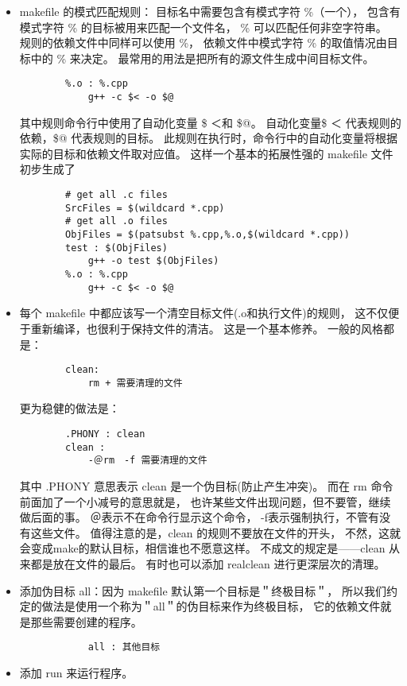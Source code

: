 \begin{itemize}
	\item makefile 的模式匹配规则：
		目标名中需要包含有模式字符 \%（一个），
		包含有模式字符 \% 的目标被用来匹配一个文件名， 
		\% 可以匹配任何非空字符串。
		规则的依赖文件中同样可以使用 \%，
		依赖文件中模式字符 \% 的取值情况由目标中的 \% 来决定。
		最常用的用法是把所有的源文件生成中间目标文件。
		\begin{verbatim}
		%.o : %.cpp
   			g++ -c $< -o $@ 
		\end{verbatim}
		其中规则命令行中使用了自动化变量 \$ ＜和 \$@。
		自动化变量\$ ＜ 代表规则的依赖，\$@ 代表规则的目标。
		此规则在执行时，命令行中的自动化变量将根据实际的目标和依赖文件取对应值。
		这样一个基本的拓展性强的 makefile 文件初步生成了
		\begin{verbatim}
		# get all .c files
		SrcFiles = $(wildcard *.cpp)
		# get all .o files
		ObjFiles = $(patsubst %.cpp,%.o,$(wildcard *.cpp))
		test : $(ObjFiles)
   			g++ -o test $(ObjFiles)
		%.o : %.cpp
   			g++ -c $< -o $@ 
		\end{verbatim}
	\item 每个 makefile 中都应该写一个清空目标文件(.o和执行文件)的规则，
		这不仅便于重新编译，也很利于保持文件的清洁。
		这是一个基本修养。
		一般的风格都是：
		\begin{verbatim}
		clean: 
   			rm + 需要清理的文件
		\end{verbatim}		
		更为稳健的做法是：
		\begin{verbatim}
		.PHONY : clean
		clean :
   			-＠rm　-f 需要清理的文件 
		\end{verbatim}	
		其中 .PHONY 意思表示 clean 是一个伪目标(防止产生冲突)。
		而在 rm 命令前面加了一个小减号的意思就是，
		也许某些文件出现问题，但不要管，继续做后面的事。
		＠表示不在命令行显示这个命令，
		-f表示强制执行，不管有没有这些文件。
		值得注意的是，clean 的规则不要放在文件的开头，
		不然，这就会变成make的默认目标，相信谁也不愿意这样。
		不成文的规定是——clean 从来都是放在文件的最后。
		有时也可以添加 realclean 进行更深层次的清理。
	\item 添加伪目标 all：因为 makefile 默认第一个目标是＂终极目标＂，
		所以我们约定的做法是使用一个称为＂all＂的伪目标来作为终极目标，
		它的依赖文件就是那些需要创建的程序。
		\begin{verbatim}
			all : 其他目标
		\end{verbatim}
	\item 添加 run 来运行程序。
	
\end{itemize}

